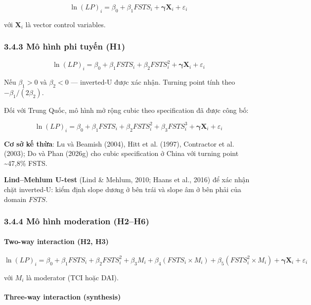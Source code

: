 \documentclass[12pt,a4paper]{article}
\begin{document}
\[\ln(LP)_i = \beta_0 + \beta_1 FSTS_i + \boldsymbol{\gamma} \mathbf{X}_i + \varepsilon_i\]

với \(\mathbf{X}_i\) là vector control variables.

\hypertarget{343-muxf4-huxecnh-phi-tuyux1ebfn-h1}{%
\subsubsection{3.4.3 Mô hình phi tuyến
(H1)}\label{343-muxf4-huxecnh-phi-tuyux1ebfn-h1}}

\[\ln(LP)_i = \beta_0 + \beta_1 FSTS_i + \beta_2 FSTS_i^2 + \boldsymbol{\gamma} \mathbf{X}_i + \varepsilon_i\]

Nếu \(\beta_1 > 0\) và \(\beta_2 < 0\) --- inverted-U được xác nhận.
Turning point tính theo \(-\beta_1 / (2\beta_2)\).

Đối với Trung Quốc, mô hình mở rộng cubic theo specification đã được
công bố:

\[\ln(LP)_i = \beta_0 + \beta_1 FSTS_i + \beta_2 FSTS_i^2 + \beta_3 FSTS_i^3 + \boldsymbol{\gamma} \mathbf{X}_i + \varepsilon_i\]

\textbf{Cơ sở kế thừa}: Lu và Beamish (2004), Hitt et al. (1997),
Contractor et al. (2003); Do và Phan (2026g) cho cubic specification ở
China với turning point \textasciitilde47,8\% FSTS.

\textbf{Lind--Mehlum U-test} (Lind \& Mehlum, 2010; Haans et al., 2016)
để xác nhận chặt inverted-U: kiểm định slope dương ở bên trái và slope
âm ở bên phải của domain \(FSTS\).

\hypertarget{344-muxf4-huxecnh-moderation-h2h6}{%
\subsubsection{3.4.4 Mô hình moderation
(H2--H6)}\label{344-muxf4-huxecnh-moderation-h2h6}}

\hypertarget{two-way-interaction-h2-h3}{%
\paragraph{Two-way interaction (H2,
H3)}\label{two-way-interaction-h2-h3}}

\[\ln(LP)_i = \beta_0 + \beta_1 FSTS_i + \beta_2 FSTS_i^2 + \beta_3 M_i + \beta_4 (FSTS_i \times M_i) + \beta_5 (FSTS_i^2 \times M_i) + \boldsymbol{\gamma} \mathbf{X}_i + \varepsilon_i\]

với \(M_i\) là moderator (TCI hoặc DAI).

\hypertarget{three-way-interaction-synthesis}{%
\paragraph{Three-way interaction
(synthesis)}\label{three-way-interaction-synthesis}}
\end{document}

